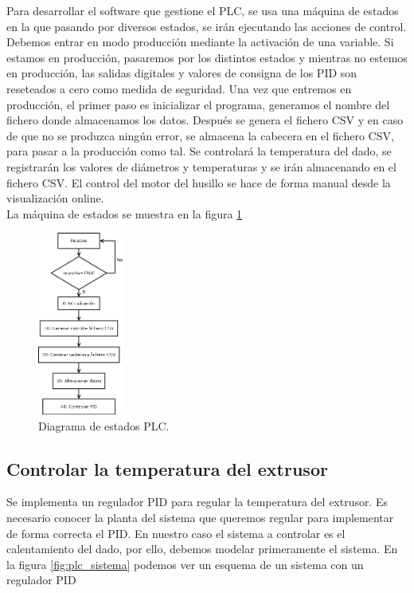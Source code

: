 Para desarrollar el software que gestione el PLC, se usa una máquina de estados en la que pasando por diversos estados, se irán ejecutando las acciones de control. Debemos entrar en modo producción mediante la activación de una variable. Si estamos en producción, pasaremos por los distintos estados y mientras no estemos en producción, las salidas digitales y valores de consigna de los PID son reseteados a cero como medida de seguridad. Una vez que entremos en producción, el primer paso es inicializar el programa, generamos el nombre del fichero donde almacenamos los datos. Después se genera el fichero CSV y en caso de que no se produzca ningún error, se almacena la cabecera en el fichero CSV, para pasar a la producción como tal. Se controlará la temperatura del dado, se registrarán los valores de diámetros y temperaturas y se irán almacenando en el fichero CSV. El control del motor del husillo se hace de forma manual desde la visualización online.\\

La máquina de estados se muestra en la figura \ref{fig:plc_estados}

\begin{figure}[H]
    \centering
    \includegraphics[width=0.25\textwidth]{images/PLC/diagrama.png}
    \caption[Diagrama de estados PLC.]{Diagrama de estados PLC.}
    \label{fig:plc_estados}
\end{figure}

\subsection{Controlar la temperatura del extrusor}
\label{sec:plc_PID}

Se implementa un regulador PID para regular la temperatura del extrusor. Es necesario conocer la planta del sistema que queremos regular para implementar de forma correcta el PID. En nuestro caso el sistema a controlar es el calentamiento del dado, por ello, debemos modelar primeramente el sistema. En la figura \ref{fig:plc_sistema} podemos ver un esquema de un sistema con un regulador PID\\

